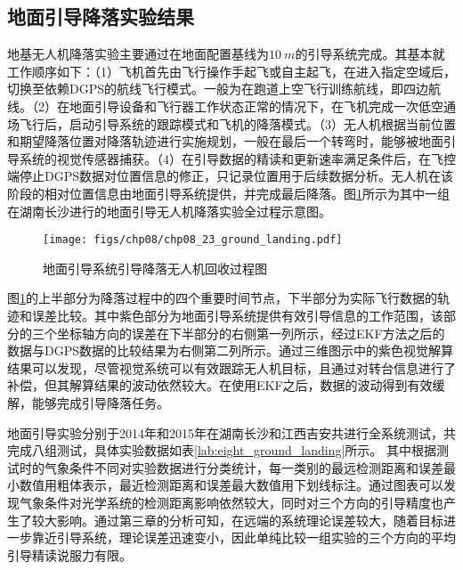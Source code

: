 \subsection{地面引导降落实验结果}
地基无人机降落实验主要通过在地面配置基线为$10\ m$的引导系统完成。其基本就工作顺序如下：（1）飞机首先由飞行操作手起飞或自主起飞，在进入指定空域后，切换至依赖DGPS的航线飞行模式。一般为在跑道上空飞行训练航线，即四边航线。（2）在地面引导设备和飞行器工作状态正常的情况下，在飞机完成一次低空通场飞行后，启动引导系统的跟踪模式和飞机的降落模式。（3）无人机根据当前位置和期望降落位置对降落轨迹进行实施规划，一般在最后一个转弯时，能够被地面引导系统的视觉传感器捕获。（4）在引导数据的精读和更新速率满足条件后，在飞控端停止DGPS数据对位置信息的修正，只记录位置用于后续数据分析。无人机在该阶段的相对位置信息由地面引导系统提供，并完成最后降落。图\ref{fig:chp08_23_ground_landing}所示为其中一组在湖南长沙进行的地面引导无人机降落实验全过程示意图。
\begin{figure}[!th]
	\centering
	\texttt{[image: figs/chp08/chp08\_23\_ground\_landing.pdf]}	
	\caption{地面引导系统引导降落无人机回收过程图}
	\label{fig:chp08_23_ground_landing}
\end{figure}
图\ref{fig:chp08_23_ground_landing}的上半部分为降落过程中的四个重要时间节点，下半部分为实际飞行数据的轨迹和误差比较。其中紫色部分为地面引导系统提供有效引导信息的工作范围，该部分的三个坐标轴方向的误差在下半部分的右侧第一列所示，经过EKF方法之后的数据与DGPS数据的比较结果为右侧第二列所示。通过三维图示中的紫色视觉解算结果可以发现，尽管视觉系统可以有效跟踪无人机目标，且通过对转台信息进行了补偿，但其解算结果的波动依然较大。在使用EKF之后，数据的波动得到有效缓解，能够完成引导降落任务。

地面引导实验分别于2014年和2015年在湖南长沙和江西吉安共进行全系统测试，共完成八组测试，具体实验数据如表\ref{lab:eight_ground_landing}所示。 其中根据测试时的气象条件不同对实验数据进行分类统计，每一类别的最远检测距离和误差最小数值用粗体表示，最近检测距离和误差最大数值用下划线标注。通过图表可以发现气象条件对光学系统的检测距离影响依然较大，同时对三个方向的引导精度也产生了较大影响。通过第三章的分析可知，在远端的系统理论误差较大，随着目标进一步靠近引导系统，理论误差迅速变小，因此单纯比较一组实验的三个方向的平均引导精读说服力有限。

